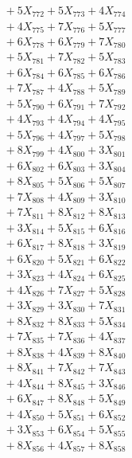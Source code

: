 \documentclass[a4paper,10pt]{article}
\begin{document}
{\begin{align}
&\;  + 5 X_{772} + 5 X_{773} + 4 X_{774} \\[0.3ex]
&\;  + 4 X_{775} + 7 X_{776} + 5 X_{777} \\[0.3ex]
&\;  + 6 X_{778} + 6 X_{779} + 7 X_{780} \\[0.3ex]
&\;  + 5 X_{781} + 7 X_{782} + 5 X_{783} \\[0.3ex]
&\;  + 6 X_{784} + 6 X_{785} + 6 X_{786} \\[0.3ex]
&\;  + 7 X_{787} + 4 X_{788} + 5 X_{789} \\[0.5ex]\allowbreak
&\;  + 5 X_{790} + 6 X_{791} + 7 X_{792} \\[0.3ex]
&\;  + 4 X_{793} + 4 X_{794} + 4 X_{795} \\[0.3ex]
&\;  + 5 X_{796} + 4 X_{797} + 5 X_{798} \\[0.3ex]
&\;  + 8 X_{799} + 4 X_{800} + 3 X_{801} \\[0.3ex]
&\;  + 6 X_{802} + 6 X_{803} + 3 X_{804} \\[0.3ex]
&\;  + 8 X_{805} + 5 X_{806} + 5 X_{807} \\[0.3ex]
&\;  + 7 X_{808} + 4 X_{809} + 3 X_{810} \\[0.3ex]
&\;  + 7 X_{811} + 8 X_{812} + 8 X_{813} \\[0.3ex]
&\;  + 3 X_{814} + 5 X_{815} + 6 X_{816} \\[0.3ex]
&\;  + 6 X_{817} + 8 X_{818} + 3 X_{819} \\[0.5ex]\allowbreak
&\;  + 6 X_{820} + 5 X_{821} + 6 X_{822} \\[0.3ex]
&\;  + 3 X_{823} + 4 X_{824} + 6 X_{825} \\[0.3ex]
&\;  + 4 X_{826} + 7 X_{827} + 5 X_{828} \\[0.3ex]
&\;  + 3 X_{829} + 3 X_{830} + 7 X_{831} \\[0.3ex]
&\;  + 8 X_{832} + 8 X_{833} + 5 X_{834} \\[0.3ex]
&\;  + 7 X_{835} + 7 X_{836} + 4 X_{837} \\[0.3ex]
&\;  + 8 X_{838} + 4 X_{839} + 8 X_{840} \\[0.3ex]
&\;  + 8 X_{841} + 7 X_{842} + 7 X_{843} \\[0.3ex]
&\;  + 4 X_{844} + 8 X_{845} + 3 X_{846} \\[0.3ex]
&\;  + 6 X_{847} + 8 X_{848} + 5 X_{849} \\[0.5ex]\allowbreak
&\;  + 4 X_{850} + 5 X_{851} + 6 X_{852} \\[0.3ex]
&\;  + 3 X_{853} + 6 X_{854} + 5 X_{855} \\[0.3ex]
&\;  + 8 X_{856} + 4 X_{857} + 8 X_{858} \\[0.3ex]

\end{align}}
\end{document}
